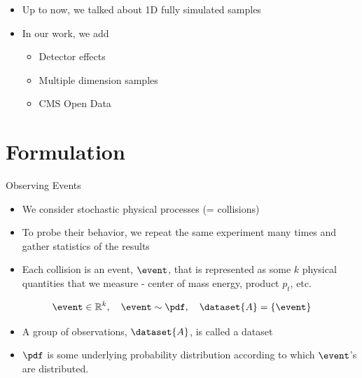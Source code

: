 \documentclass[notheorems]{beamer}
\begin{document}
\begin{frame}
    \begin{itemize}
        \item Up to now, we talked about 1D fully simulated samples
        \item In our work, we add
        \begin{itemize}
            \item Detector effects
            \item Multiple dimension samples
            \item CMS Open Data
        \end{itemize}
    \end{itemize}
\end{frame}

\section{Formulation}

\begin{frame}{Observing Events}
    \begin{itemize}
        \item We consider stochastic physical processes (= collisions)
        \item To probe their behavior, we repeat the same experiment many times and gather statistics of the results
        \item Each collision is an event, $\event$, that is represented as some $k$ physical quantities that we measure - center of mass energy, product $p_t$, etc.
    \end{itemize}
    \begin{equation}
        \event \in \mathbb{R}^k, \quad \event \sim \pdf, \quad \dataset{A} = \{\event\}
    \end{equation}
    \begin{itemize}
        \item A group of observations, $\dataset{A}$, is called a dataset
        \item $\pdf$ is some underlying probability distribution according to which $\event$'s are distributed.
    \end{itemize}
\end{frame}
\end{document}
